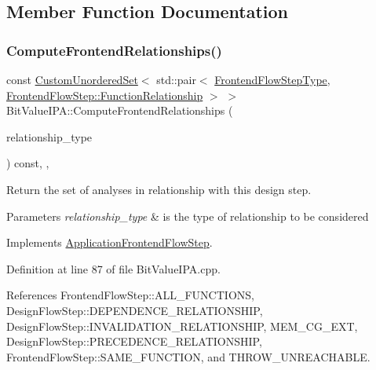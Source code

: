 \subsection{Member Function Documentation}
\mbox{\label{classBitValueIPA_a0e16342c15cf3d4544c1f96e40837e0a}} 
\subsubsection{\texorpdfstring{Compute\+Frontend\+Relationships()}{ComputeFrontendRelationships()}}
{\footnotesize\ttfamily const \hyperlink{classCustomUnorderedSet}{Custom\+Unordered\+Set}$<$ std\+::pair$<$ \hyperlink{frontend__flow__step_8hpp_afeb3716c693d2b2e4ed3e6d04c3b63bb}{Frontend\+Flow\+Step\+Type}, \hyperlink{classFrontendFlowStep_af7cf30f2023e5b99e637dc2058289ab0}{Frontend\+Flow\+Step\+::\+Function\+Relationship} $>$ $>$ Bit\+Value\+I\+P\+A\+::\+Compute\+Frontend\+Relationships (\begin{DoxyParamCaption}\item[{const \hyperlink{classDesignFlowStep_a723a3baf19ff2ceb77bc13e099d0b1b7}{Design\+Flow\+Step\+::\+Relationship\+Type}}]{relationship\+\_\+type }\end{DoxyParamCaption}) const\hspace{0.3cm}{\ttfamily [override]}, {\ttfamily [protected]}, {\ttfamily [virtual]}}



Return the set of analyses in relationship with this design step. 


\begin{DoxyParams}{Parameters}
{\em relationship\+\_\+type} & is the type of relationship to be considered \\
\hline
\end{DoxyParams}


Implements \hyperlink{classApplicationFrontendFlowStep_ab308200c0096ccff3a1ff50e864ed61f}{Application\+Frontend\+Flow\+Step}.



Definition at line 87 of file Bit\+Value\+I\+P\+A.\+cpp.



References Frontend\+Flow\+Step\+::\+A\+L\+L\+\_\+\+F\+U\+N\+C\+T\+I\+O\+NS, Design\+Flow\+Step\+::\+D\+E\+P\+E\+N\+D\+E\+N\+C\+E\+\_\+\+R\+E\+L\+A\+T\+I\+O\+N\+S\+H\+IP, Design\+Flow\+Step\+::\+I\+N\+V\+A\+L\+I\+D\+A\+T\+I\+O\+N\+\_\+\+R\+E\+L\+A\+T\+I\+O\+N\+S\+H\+IP, M\+E\+M\+\_\+\+C\+G\+\_\+\+E\+XT, Design\+Flow\+Step\+::\+P\+R\+E\+C\+E\+D\+E\+N\+C\+E\+\_\+\+R\+E\+L\+A\+T\+I\+O\+N\+S\+H\+IP, Frontend\+Flow\+Step\+::\+S\+A\+M\+E\+\_\+\+F\+U\+N\+C\+T\+I\+ON, and T\+H\+R\+O\+W\+\_\+\+U\+N\+R\+E\+A\+C\+H\+A\+B\+LE.

